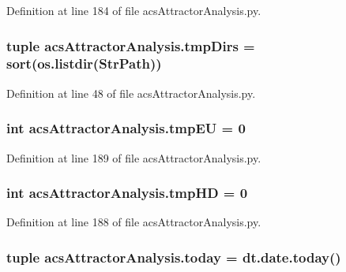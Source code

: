 Definition at line 184 of file acs\-Attractor\-Analysis.\-py.

\hypertarget{a00090_ac88c3245a42ebefee3fcf90626f6eaf4}{
\subsubsection[{tmp\-Dirs}]{\setlength{\rightskip}{0pt plus 5cm}tuple acs\-Attractor\-Analysis.\-tmp\-Dirs = sort(os.\-listdir({\bf Str\-Path}))}}\label{a00090_ac88c3245a42ebefee3fcf90626f6eaf4}


Definition at line 48 of file acs\-Attractor\-Analysis.\-py.

\hypertarget{a00090_a0c4860774229747cda9dabe70614abc6}{
\subsubsection[{tmp\-E\-U}]{\setlength{\rightskip}{0pt plus 5cm}int acs\-Attractor\-Analysis.\-tmp\-E\-U = 0}}\label{a00090_a0c4860774229747cda9dabe70614abc6}


Definition at line 189 of file acs\-Attractor\-Analysis.\-py.

\hypertarget{a00090_a1fe1582f1d1dc5f55558d25c8eb30ad7}{
\subsubsection[{tmp\-H\-D}]{\setlength{\rightskip}{0pt plus 5cm}int acs\-Attractor\-Analysis.\-tmp\-H\-D = 0}}\label{a00090_a1fe1582f1d1dc5f55558d25c8eb30ad7}


Definition at line 188 of file acs\-Attractor\-Analysis.\-py.

\hypertarget{a00090_a71bc5e3d205016fb7893b438e75be78e}{
\subsubsection[{today}]{\setlength{\rightskip}{0pt plus 5cm}tuple acs\-Attractor\-Analysis.\-today = dt.\-date.\-today()}}\label{a00090_a71bc5e3d205016fb7893b438e75be78e}



